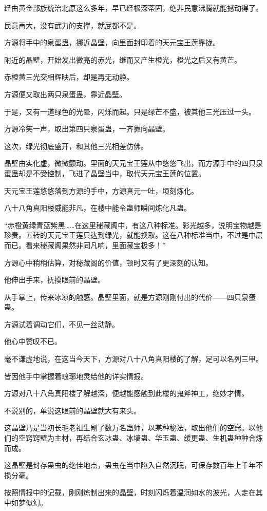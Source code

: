 \begin{this_body}
经由黄金部族统治北原这么多年，早已经根深蒂固，绝非民意沸腾就能撼动得了。

民意再大，没有武力的支撑，就屁都不是。

方源将手中的泉蛋蛊，挪近晶壁，向里面封印着的天元宝王莲靠拢。

附近的晶壁，开始发出微亮的赤光，继而又产生橙光，橙光之后又有黄芒。

赤橙黄三光交相辉映后，却是再无动静。

方源便又取出两只泉蛋蛊，靠近晶壁。

于是，又有一道绿色的光晕，闪烁而起。只是绿芒不盛，被其他三光压过一头。

方源冷笑一声，取出第四只泉蛋蛊，一齐靠向晶壁。

这次，绿光彻底盛开，和其他三光相差仿佛。

晶壁由实化虚，微微颤动。里面的天元宝王莲从中悠悠飞出，而方源手中的四只泉蛋蛊却是不受控制，飞进了晶壁当中，取代天元宝王莲的位置。

天元宝王莲悠悠落到方源的手中，方源真元一吐，顷刻炼化。

八十八角真阳楼威能非凡，在楼中能令蛊师瞬间炼化凡蛊。

“赤橙黄绿青蓝紫黑……在这里秘藏阁中，有这八种标准。彩光越多，说明宝物越是珍贵。五转的天元宝王莲只达到绿光，就能换取。这在八种标准当中，不过是中层而已。看来秘藏阁果然非同凡响，里面藏宝极多！”

方源心中稍稍估算，对秘藏阁的价值，顿时又有了更深刻的认知。

他伸出手来，抚摸眼前的晶壁。

从手掌上，传来冰凉的触感。晶壁里面，就是方源刚刚付出的代价――四只泉蛋蛊。

方源试着调动它们，不见一丝动静。

他心中赞叹不已。

毫不谦虚地说，在这当今天下，方源对八十八角真阳楼的了解，足可以名列三甲。

皆因他手中掌握着琅琊地灵给他的详实情报。

方源对八十八角真阳楼了解越深，便越能感触到此楼的鬼斧神工，绝妙才情。

不说别的，单说这眼前的晶壁就大有来头。

这晶壁乃是当初长毛老祖生剐了数万名蛊师，以某种秘法，取出他们的空窍。以他们的空窍窍壁为主材，再结合玄冰蛊、冰墙蛊、华玉蛊、缓更蛊、生机蛊种种合炼而成。

这晶壁是封存蛊虫的绝佳地点，蛊虫在当中陷入自然沉眠，可保存数百年上千年不损分毫。

按照情报中的记载，刚刚炼制出来的晶壁，时刻闪烁着温润如水的波光，人走在其中如梦似幻。


\end{this_body}
